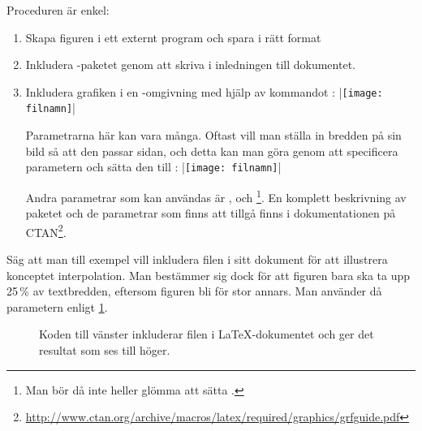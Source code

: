 \documentclass[lang=sv,ptsize=10pt,font=none,nomath,titles=bf,../../a4.tex]{subfiles}
\begin{document}
Proceduren är enkel:
\begin{enumerate}
	\item Skapa figuren i ett externt program och spara i rätt format
	
	\item Inkludera -paketet genom att skriva
	 i inledningen till dokumentet.
	
	\item Inkludera grafiken i en -omgivning med hjälp av
	kommandot :
	\latex|\texttt{[image: filnamn]}|
	
	Parametrarna här kan vara många. Oftast vill man ställa in bredden på
	sin bild så att den passar sidan, och detta kan man göra genom att
	specificera parametern  och sätta den till
	:
	\latex|\texttt{[image: filnamn]}|
	
	Andra parametrar som kan användas är , 
	och \footnote{Man bör då inte heller glömma att sätta
	.\hfil}. En komplett beskrivning av paketet och de 
	parametrar som finns att tillgå finns i dokumentationen på
	CTAN\footnote{\url{http://www.ctan.org/archive/macros/latex/required/graphics/grfguide.pdf}}.
\end{enumerate}

Säg att man till exempel vill inkludera filen 
i sitt dokument för att illustrera konceptet interpolation. Man bestämmer
sig dock för att figuren bara ska ta upp 25\,\% av textbredden, eftersom
figuren bli för stor annars. Man använder då parametern 
enligt \cref{fig:graphicx}.%

\begin{figure}[tbp]
	\centering
	\hspace{-0.025\textwidth}
	\begin{minipage}{0.475\textwidth} %
	\end{minipage}
	\hfil
	\begin{minipage}{0.475\textwidth} %
	\end{minipage}
	\caption{Koden till vänster inkluderar filen  i
	\LaTeX-dokumentet och ger det resultat som ses till höger.}
	\label{fig:graphicx}
\end{figure}
\end{document}
